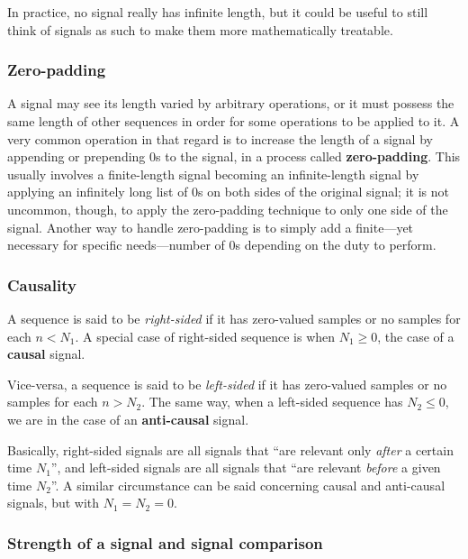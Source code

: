 \documentclass[\documentfontsize, twocolumn]{\classname}
\begin{document}
In practice, no signal really has infinite length, but it could be useful to still think of signals as such to make them more mathematically treatable.

\subsubsection{Zero-padding}

A signal may see its length varied by arbitrary operations, or it must possess the same length of other sequences in order for some operations to be applied to it. A very common operation in that regard is to increase the length of a signal by appending or prepending $0$s to the signal, in a process called \textbf{zero-padding}. This usually involves a finite-length signal becoming an infinite-length signal by applying an infinitely long list of $0$s on both sides of the original signal; it is not uncommon, though, to apply the zero-padding technique to only one side of the signal. Another way to handle zero-padding is to simply add a finite---yet necessary for specific needs---number of $0$s depending on the duty to perform.

\subsubsection{Causality}
A se\-quen\-ce is said to be \emph{right-sided} if it has zero-valued samples or no samples for each $n < N_1$. A special case of right-sided se\-quen\-ce is when $N_1 \geq 0$, the case of a \textbf{causal} signal.

Vice-versa, a se\-quen\-ce is said to be \emph{left-sided} if it has zero-valued samples or no samples for each $n > N_2$. The same way, when a left-sided se\-quen\-ce has $N_2 \leq 0$, we are in the case of an \textbf{anti-causal} signal.

Basically, right-sided signals are all signals that ``are relevant only \emph{after} a certain time $N_1$'', and left-sided signals are all signals that ``are relevant \emph{before} a given time $N_2$''. A similar circumstance can be said concerning causal and anti-causal signals, but with $N_1=N_2=0$.

\subsubsection{Strength of a signal and signal comparison}
\end{document}
